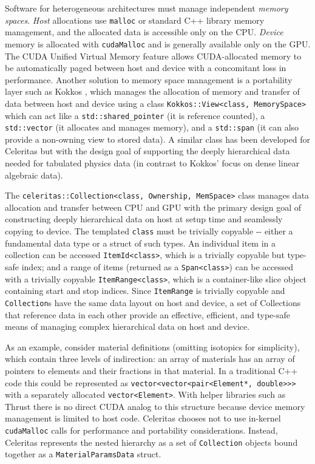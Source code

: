 Software for heterogeneous architectures must manage independent
\emph{memory spaces}. \emph{Host} allocations use \texttt{malloc} or
standard C++ library memory management, and the allocated data is
accessible only on the CPU. \emph{Device} memory is allocated with
\texttt{cudaMalloc} and is generally available only on the GPU. The CUDA
Unified Virtual Memory feature allows CUDA-allocated memory to be
automatically paged between host and device with a concomitant loss in
performance. Another solution to memory space management is a
portability layer such as Kokkos \cite{kokkos}, which manages the
allocation of memory and transfer of data between host and device using
a class
\texttt{Kokkos::View\textless{}class,\ MemorySpace\textgreater{}} which
can act like a \texttt{std::shared\_pointer} (it is reference counted),
a \texttt{std::vector} (it allocates and manages memory), and a
\texttt{std::span} (it can also provide a non-owning view to stored
data). A similar class has been developed for Celeritas but with the
design goal of supporting the deeply hierarchical data needed for
tabulated physics data (in contrast to Kokkos' focus on dense linear
algebraic data).

The
\texttt{celeritas::Collection\textless{}class,\ Ownership,\ MemSpace\textgreater{}}
class manages data allocation and transfer between CPU and GPU with the
primary design goal of constructing deeply hierarchical data on host at
setup time and seamlessly copying to device. The templated
\texttt{class} must be trivially copyable -\/- either a fundamental data
type or a struct of such types. An individual item in a collection can
be accessed \texttt{ItemId\textless{}class\textgreater{}}, which is a
trivially copyable but type-safe index; and a range of items (returned
as a \texttt{Span\textless{}class\textgreater{}}) can be accessed with a
trivially copyable \texttt{ItemRange\textless{}class\textgreater{}},
which is a container-like slice object containing start and stop
indices. Since \texttt{ItemRange} is trivially copyable and
\texttt{Collection}s have the same data layout on host and device, a set
of Collections that reference data in each other provide an effective,
efficient, and type-safe means of managing complex hierarchical data on
host and device.

As an example, consider material definitions (omitting isotopics for
simplicity), which contain three levels of indirection: an array of
materials has an array of pointers to elements and their fractions in
that material. In a traditional C++ code this could be represented as
\texttt{vector\textless{}vector\textless{}pair\textless{}Element*,\ double\textgreater{}\textgreater{}\textgreater{}}
with a separately allocated
\texttt{vector\textless{}Element\textgreater{}}. With helper libraries
such as Thrust \cite{thrust} there is no direct CUDA analog to this
structure because device memory management is limited to host code.
Celeritas chooses not to use in-kernel \texttt{cudaMalloc} calls for
performance and portability considerations. Instead, Celeritas
represents the nested hierarchy as a set of \texttt{Collection} objects
bound together as a \texttt{MaterialParamsData} struct.

